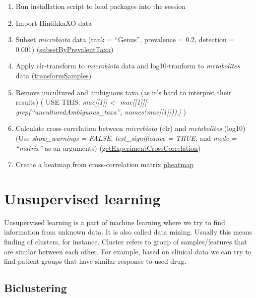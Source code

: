 \documentclass[
  oneside]{book}
\begin{document}
\begin{enumerate}
\def\labelenumi{\arabic{enumi}.}
\item
  Run installation script to load packages into the session
\item
  Import HintikkaXO data
\item
  Subset \emph{microbiota} data (rank = ``Genus'', prevalence = 0.2, detection = 0.001) (\href{https://microbiome.github.io/OMA/differential-abundance.html\#prevalence-filtering}{subsetByPrevalentTaxa})
\item
  Apply clr-transform to \emph{microbiota} data and log10-tranform to \emph{metabolites} data (\href{https://microbiome.github.io/OMA/taxonomic-information.html\#data-transformation}{transformSamples})
\item
  Remove uncultured and ambiguous taxa (as it's hard to interpret their results) ( USE THIS: \emph{mae{[}{[}1{]}{]} \textless- mae{[}{[}1{]}{]}{[}-grep(``uncultured\textbar Ambiguous\_taxa'', names(mae{[}{[}1{]}{]})),{]}} )
\item
  Calculate cross-correlation between \emph{microbiota} (clr) and \emph{metabolites} (log10) (Use \emph{show\_warnings = FALSE}, \emph{test\_significance = TRUE}, and \emph{mode = ``matrix''} as an arguments)
  (\href{https://microbiome.github.io/OMA/multi-assay_analyses.html\#multi-assay_analyses}{getExperimentCrossCorrelation})
\item
  Create a heatmap from cross-correlation matrix \href{https://microbiome.github.io/OMA/microbiome-community.html\#composition-heatmap}{pheatmap}
\end{enumerate}

\hypertarget{unsupervised-learning}{%
\section{Unsupervised learning}\label{unsupervised-learning}}

Unsupervised learning is a part of machine learning where we try to find information
from unknown data. It is also called data mining. Usually this means finding of
clusters, for instance. Cluster refers to group of samples/features that are similar
between each other. For example, based on clinical data we can try to find patient
groups that have similar response to used drug.

\hypertarget{biclustering}{%
\subsection{Biclustering}\label{biclustering}}
\end{document}
